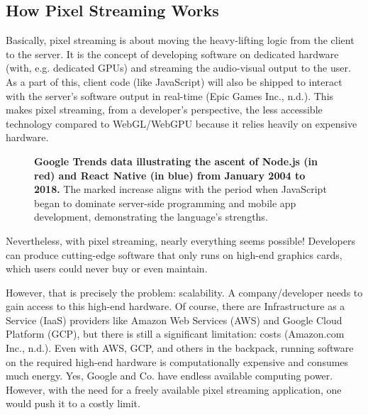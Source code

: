 \documentclass[10pt]{article}
\begin{document}
\begin{sloppypar}
  \subsection{How Pixel Streaming Works}
  \label{subsec:how-pixel-streaming-works}

  Basically, pixel streaming is about moving the heavy-lifting logic from the client to the server. It is the concept of developing software on dedicated hardware (with, e.g. dedicated GPUs) and streaming the audio-visual output to the user. As a part of this, client code (like JavaScript) will also be shipped to interact with the server’s software output in real-time (Epic Games Inc., n.d.). This makes pixel streaming, from a developer’s perspective, the less accessible technology compared to WebGL/WebGPU because it relies heavily on expensive hardware.

  \begin{figure}[ht]
    \centering
    \caption[Google Trends data illustrating the ascent of Node.js and React Native.]{\textbf{Google Trends data illustrating the ascent of Node.js (in red) and React Native (in blue) from January 2004 to 2018.} The marked increase aligns with the period when JavaScript began to dominate server-side programming and mobile app development, demonstrating the language’s strengths.}
    \label{fig:pixel-streaming-architecture}
  \end{figure}

  Nevertheless, with pixel streaming, nearly everything seems possible! Developers can produce cutting-edge software that only runs on high-end graphics cards, which users could never buy or even maintain.

  However, that is precisely the problem: scalability. A company/developer needs to gain access to this high-end hardware. Of course, there are Infrastructure as a Service (IaaS) providers like Amazon Web Services (AWS) and Google Cloud Platform (GCP), but there is still a significant limitation: costs (Amazon.com Inc., n.d.). Even with AWS, GCP, and others in the backpack, running software on the required high-end hardware is computationally expensive and consumes much energy. Yes, Google and Co. have endless available computing power. However, with the need for a freely available pixel streaming application, one would push it to a costly limit.


\end{sloppypar}
\end{document}
